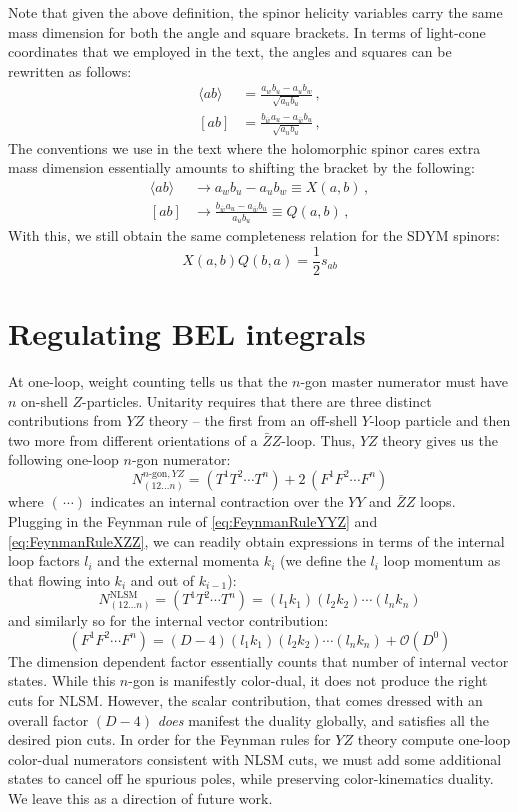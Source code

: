 \documentclass[11pt,letter]{article}
\def\be{\begin{equation}}
\def\ee{\end{equation}}
\begin{document}
Note that given the above definition, the spinor helicity variables carry the same mass dimension for both the angle and square brackets. In terms of light-cone coordinates that we employed in the text, the angles and squares can be rewritten as follows:
\begin{align}
\langle ab \rangle &= \frac{a_w b_u-a_u b_w}{\sqrt{a_ub_u}}\,,
\\
[ab] &= \frac{b_{\bar{w}}a_u-a_{\bar{w}}b_u}{\sqrt{a_ub_u}}\,,
\end{align}
The conventions we use in the text where the holomorphic spinor cares extra mass dimension essentially amounts to shifting the bracket by the following:
\begin{align}
\langle ab \rangle &\rightarrow a_w b_u-a_u b_w \equiv X(a,b)\,,
\\
[ab] &\rightarrow \frac{b_{\bar{w}}a_u-a_{\bar{w}}b_u}{a_ub_u}\equiv Q(a,b)\,,
\end{align}
With this, we still obtain the same completeness relation for the SDYM spinors:
\be
X(a,b)Q(b,a) = \frac{1}{2}s_{ab}
\ee
\section{Regulating BEL integrals}
At one-loop, weight counting tells us that the $n$-gon master numerator must have $n$ on-shell $Z$-particles. Unitarity requires that there are three distinct contributions from $Y\!Z$ theory -- the first from an off-shell $Y$-loop particle and then two more from different orientations of a $\bar{Z}Z$-loop.  Thus, $Y\!Z$ theory gives us the following one-loop $n$-gon numerator:
\be
N^{n\text{-gon},YZ}_{(12...n)} = (T^{1}T^{2}\cdots T^{n})+2\, (F^1F^2\cdots F^n)
\ee
where $(\,\cdots)$ indicates an internal contraction over the $YY$ and $\bar{Z}Z$ loops. Plugging in the Feynman rule of \cref{eq:FeynmanRuleYYZ} and \cref{eq:FeynmanRuleXZZ}, we can readily obtain expressions in terms of the internal loop factors $l_i$ and the external momenta $k_i$ (we define the $l_i$ loop momentum as that flowing into $k_i$ and out of $k_{i-1}$):
\be
N_{(12...n)}^{\text{NLSM}}=(T^{1}T^{2}\cdots T^{n}) = (l_1 k_1)(l_2 k_2) \cdots (l_n k_n)
\ee
and similarly so for the internal vector contribution:
\be
 (F^1F^2\cdots F^n) = (D-4)(l_1 k_1)(l_2 k_2) \cdots (l_n k_n) + \mathcal{O}(D^0)
\ee
The dimension dependent factor essentially counts that number of internal vector states. While this $n$-gon is manifestly color-dual, it does not produce the right cuts for NLSM. However, the scalar contribution, that comes dressed with an overall factor $(D-4)$ \textit{does} manifest the duality globally, and satisfies all the desired pion cuts. In order for the Feynman rules for $Y\!Z$ theory compute one-loop color-dual numerators consistent with NLSM cuts, we must add some additional states to cancel off he spurious poles, while preserving color-kinematics duality. We leave this as a direction of future work. 
\end{document}

